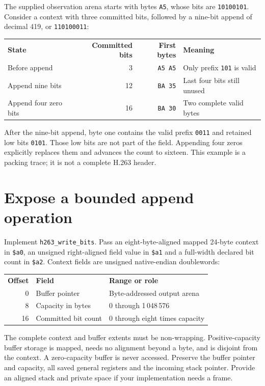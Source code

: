The supplied observation arena starts with bytes \texttt{A5}, whose bits are
\texttt{10100101}. Consider a context with three committed bits, followed by a
nine-bit append of decimal 419, or \texttt{110100011}:
\begin{center}
  \begin{tabular}{lrrl}
    \textbf{State}        & \textbf{Committed bits} & \textbf{First bytes} & \textbf{Meaning}                  \\
    Before append         & 3                       & \texttt{A5 A5}       & Only prefix \texttt{101} is valid \\
    Append nine bits      & 12                      & \texttt{BA 35}       & Last four bits still unused       \\
    Append four zero bits & 16                      & \texttt{BA 30}       & Two complete valid bytes
  \end{tabular}
\end{center}
After the nine-bit append, byte one contains the valid prefix \texttt{0011}
and retained low bits \texttt{0101}. Those low bits are not part of the field.
Appending four zeros explicitly replaces them and advances the count to sixteen.
This example is a packing trace; it is not a complete H.263 header.

\section{Expose a bounded append operation}
Implement \texttt{h263\_write\_bits}. Pass an eight-byte-aligned mapped 24-byte
context in \texttt{\$a0}, an unsigned right-aligned field value in \texttt{\$a1}
and a full-width declared bit count in \texttt{\$a2}. Context fields are unsigned
native-endian doublewords:
\begin{center}
  \begin{tabular}{rll}
    \textbf{Offset} & \textbf{Field}      & \textbf{Range or role}         \\
    0               & Buffer pointer      & Byte-addressed output arena    \\
    8               & Capacity in bytes   & 0 through 1\,048\,576          \\
    16              & Committed bit count & 0 through eight times capacity
  \end{tabular}
\end{center}
The complete context and buffer extents must be non-wrapping. Positive-capacity
buffer storage is mapped, needs no alignment beyond a byte, and is disjoint from
the context. A zero-capacity buffer is never accessed. Preserve the buffer pointer
and capacity, all saved general registers and the incoming stack pointer. Provide
an aligned stack and private space if your implementation needs a frame.

